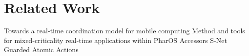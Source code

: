 \documentclass[sigconf]{acmart}
\newcommand{\martin}[1]{\mynote{Martin}{#1}{blue}}%
\newcommand{\marten}[1]{\mynote{Marten}{#1}{cyan}}%
\begin{document}
\section{Related Work}
\label{sec:related}

Towards a real-time coordination model for mobile computing \cite{hackmann2005towards}
Method and tools for mixed-criticality real-time applications within PharOS \cite{lemerre2011method}
Accessors \cite{brooks2018component}
S-Net~\cite{grelck2008gentle}
Guarded Atomic Actions~\cite{Rosenband:2004:MSG:996566.996583}
%








\end{document}
